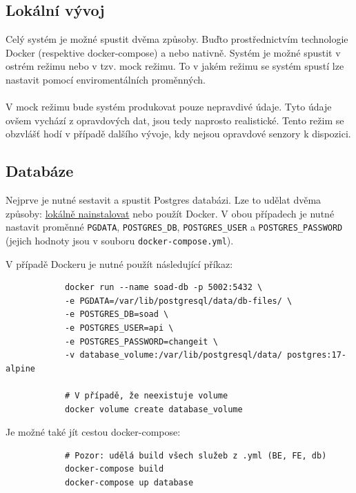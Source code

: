 \documentclass[12pt]{article}
\begin{document}
\begin{teamwork}
        \section{Lokální vývoj}\label{sec:lokalni_vyvoj}

        Celý systém je možné spustit dvěma způsoby.
        Buďto prostřednictvím technologie Docker (respektive docker-compose) a nebo nativně.
        Systém je možné spustit v ostrém režimu nebo v tzv. mock režimu.
        To v jakém režimu se systém spustí lze nastavit pomocí enviromentálních proměnných.
        \\
        \\
        V mock režimu bude systém produkovat pouze nepravdivé údaje.
        Tyto údaje ovšem vychází z opravdových dat, jsou tedy naprosto realistické.
        Tento režim se obzvlášť hodí v případě dalšího vývoje, kdy nejsou opravdové senzory k dispozici.

        \subsection{Databáze}\label{subsec:databaze}

        Nejprve je nutné sestavit a spustit Postgres databázi.
        Lze to udělat dvěma způsoby: \href{https://www.postgresql.org/download/}{lokálně nainstalovat} nebo použít Docker.
        V obou případech je nutné nastavit proměnné \texttt{PGDATA}, \texttt{POSTGRES\_DB}, \texttt{POSTGRES\_USER} a \texttt{POSTGRES\_PASSWORD} (jejich hodnoty jsou v souboru \texttt{docker-compose.yml}).

        V případě Dockeru je nutné použít následující příkaz:

        \begin{verbatim}
            docker run --name soad-db -p 5002:5432 \
            -e PGDATA=/var/lib/postgresql/data/db-files/ \
            -e POSTGRES_DB=soad \
            -e POSTGRES_USER=api \
            -e POSTGRES_PASSWORD=changeit \
            -v database_volume:/var/lib/postgresql/data/ postgres:17-alpine

            # V případě, že neexistuje volume
            docker volume create database_volume
        \end{verbatim}

        Je možné také jít cestou docker-compose:

        \begin{verbatim}
            # Pozor: udělá build všech služeb z .yml (BE, FE, db)
            docker-compose build
            docker-compose up database
        \end{verbatim}


\end{teamwork}
\end{document}
